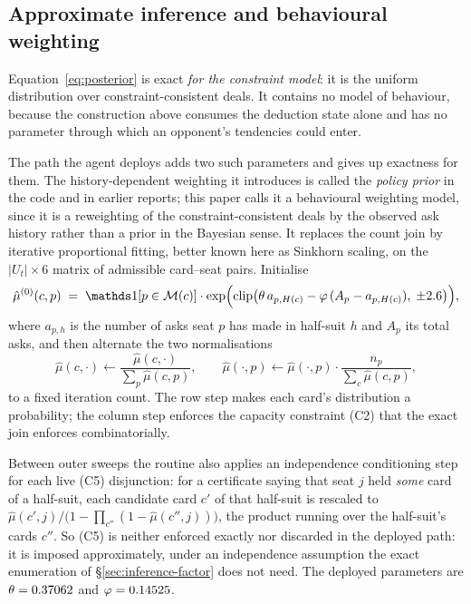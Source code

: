 \subsection{Approximate inference and behavioural weighting}
\label{sec:inference-prior}

Equation~\eqref{eq:posterior} is exact \emph{for the constraint model}: it is the uniform
distribution over constraint-consistent deals. It contains no model of behaviour, because the
construction above consumes the deduction state alone and has no parameter through which an
opponent's tendencies could enter.

The path the agent deploys adds two such parameters and gives up exactness for them. The
history-dependent weighting it introduces is called the \emph{policy prior} in the code and in
earlier reports; this paper calls it a behavioural weighting model, since it is a reweighting of the
constraint-consistent deals by the observed ask history rather than a prior in the Bayesian sense.
It replaces
the count join by iterative proportional fitting, better known here as Sinkhorn scaling, on the
$|U_t| \times 6$ matrix of admissible card--seat pairs. Initialise
\begin{equation}
  \hat\mu^{(0)}(c,p) \;=\; \ind\!\left[p \in \mathcal{M}(c)\right] \cdot
  \exp\Bigl(\operatorname{clip}\bigl(\theta\, a_{p,H(c)} - \varphi\, (A_p - a_{p,H(c)}),\; \pm 2.6\bigr)\Bigr),
  \label{eq:prior}
\end{equation}
where $a_{p,h}$ is the number of asks seat $p$ has made in half-suit $h$ and $A_p$ its total asks, and
then alternate the two normalisations
\begin{equation}
  \hat\mu(c,\cdot) \leftarrow \frac{\hat\mu(c,\cdot)}{\sum_{p}\hat\mu(c,p)},
  \qquad
  \hat\mu(\cdot,p) \leftarrow \hat\mu(\cdot,p)\cdot\frac{n_p}{\sum_{c}\hat\mu(c,p)},
  \label{eq:sinkhorn}
\end{equation}
to a fixed iteration count. The row step makes each card's distribution a probability; the column
step enforces the capacity constraint (C2) that the exact join enforces combinatorially.

Between outer sweeps the routine also applies an independence conditioning step for each live (C5)
disjunction: for a certificate saying that seat $j$ held \emph{some} card of a half-suit,
each candidate card $c'$ of that half-suit is rescaled to
$\hat\mu(c',j) \big/ \bigl(1 - \prod_{c''}(1 - \hat\mu(c'',j))\bigr)$, the product running over the
half-suit's cards $c''$.
So (C5) is neither enforced exactly nor discarded in the deployed path: it is imposed approximately,
under an independence assumption the exact enumeration of \S\ref{sec:inference-factor} does not need.
The deployed parameters are $\theta = 0.37062{}$ and $\varphi = 0.14525{}$.

